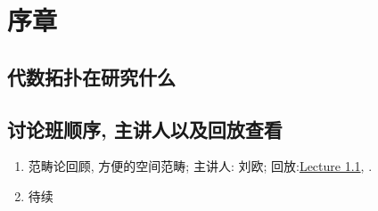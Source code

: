\chapter*{序章}
\section{代数拓扑在研究什么}
\section{讨论班顺序, 主讲人以及回放查看}
\begin{enumerate}
    \item 范畴论回顾, 方便的空间范畴; 主讲人: 刘欧; 回放:\href{https://www.bilibili.com/video/BV1thxEeRE6h/?spm_id_from=333.999.0.0}{Lecture 1.1}, .
    \item 待续
\end{enumerate}

